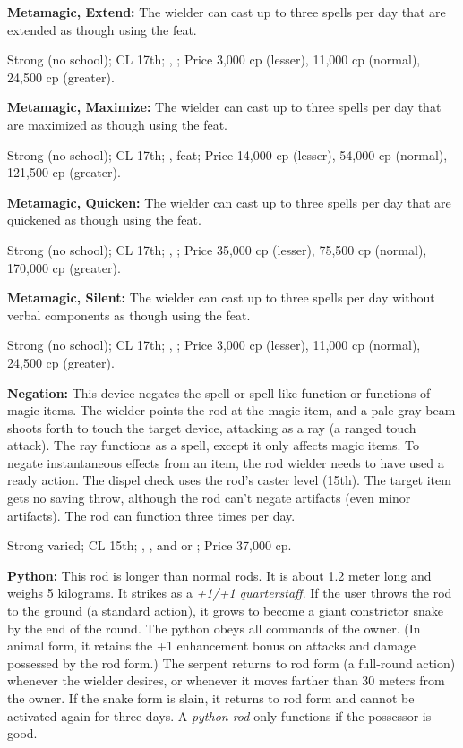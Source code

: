 \textbf{Metamagic, Extend:} The wielder can cast up to three spells per day that are extended as though using the  feat.

Strong (no school); CL 17th; , ; Price 3,000 cp (lesser), 11,000 cp (normal), 24,500 cp (greater).

\textbf{Metamagic, Maximize:} The wielder can cast up to three spells per day that are maximized as though using the  feat.

Strong (no school); CL 17th; ,  feat; Price 14,000 cp (lesser), 54,000 cp (normal), 121,500 cp (greater).

\textbf{Metamagic, Quicken:} The wielder can cast up to three spells per day that are quickened as though using the  feat.

Strong (no school); CL 17th; , ; Price 35,000 cp (lesser), 75,500 cp (normal), 170,000 cp (greater).

\textbf{Metamagic, Silent:} The wielder can cast up to three spells per day without verbal components as though using the  feat.

Strong (no school); CL 17th; , ; Price 3,000 cp (lesser), 11,000 cp (normal), 24,500 cp (greater).

\textbf{Negation:} This device negates the spell or spell-like function or functions of magic items. The wielder points the rod at the magic item, and a pale gray beam shoots forth to touch the target device, attacking as a ray (a ranged touch attack). The ray functions as a  spell, except it only affects magic items. To negate instantaneous effects from an item, the rod wielder needs to have used a ready action. The dispel check uses the rod's caster level (15th). The target item gets no saving throw, although the rod can't negate artifacts (even minor artifacts). The rod can function three times per day.

Strong varied; CL 15th; , , and  or ; Price 37,000 cp.

\textbf{Python:} This rod is longer than normal rods. It is about 1.2 meter long and weighs 5 kilograms. It strikes as a \emph{+1/+1 quarterstaff}. If the user throws the rod to the ground (a standard action), it grows to become a giant constrictor snake by the end of the round. The python obeys all commands of the owner. (In animal form, it retains the +1 enhancement bonus on attacks and damage possessed by the rod form.) The serpent returns to rod form (a full-round action) whenever the wielder desires, or whenever it moves farther than 30 meters from the owner. If the snake form is slain, it returns to rod form and cannot be activated again for three days. A \emph{python rod} only functions if the possessor is good.

